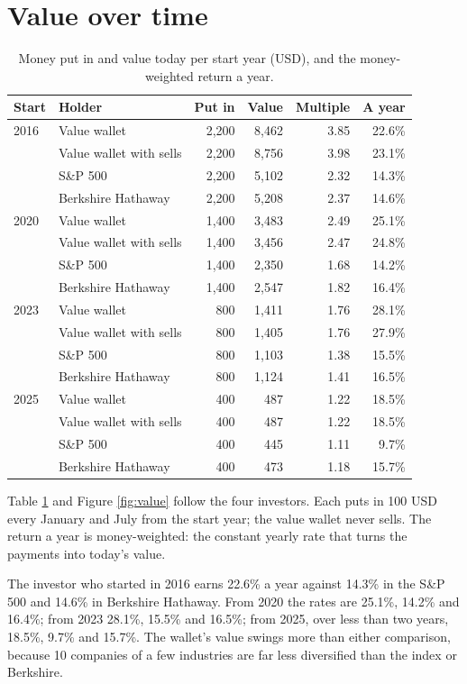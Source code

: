 \documentclass[11pt,a4paper]{article}
\begin{document}
\section{Value over time}
\begin{table}[H]
\centering
\small
\caption{Money put in and value today per start year (USD), and the money-weighted return a year.}\label{tab:value}
\begin{tabular}{l l r r r r}
\hline
Start & Holder & Put in & Value & Multiple & A year \\
\hline
2016 & Value wallet & 2,200 & 8,462 & 3.85 & 22.6\% \\
 & Value wallet with sells & 2,200 & 8,756 & 3.98 & 23.1\% \\
 & S\&P 500 & 2,200 & 5,102 & 2.32 & 14.3\% \\
 & Berkshire Hathaway & 2,200 & 5,208 & 2.37 & 14.6\% \\
\hline
2020 & Value wallet & 1,400 & 3,483 & 2.49 & 25.1\% \\
 & Value wallet with sells & 1,400 & 3,456 & 2.47 & 24.8\% \\
 & S\&P 500 & 1,400 & 2,350 & 1.68 & 14.2\% \\
 & Berkshire Hathaway & 1,400 & 2,547 & 1.82 & 16.4\% \\
\hline
2023 & Value wallet & 800 & 1,411 & 1.76 & 28.1\% \\
 & Value wallet with sells & 800 & 1,405 & 1.76 & 27.9\% \\
 & S\&P 500 & 800 & 1,103 & 1.38 & 15.5\% \\
 & Berkshire Hathaway & 800 & 1,124 & 1.41 & 16.5\% \\
\hline
2025 & Value wallet & 400 & 487 & 1.22 & 18.5\% \\
 & Value wallet with sells & 400 & 487 & 1.22 & 18.5\% \\
 & S\&P 500 & 400 & 445 & 1.11 & 9.7\% \\
 & Berkshire Hathaway & 400 & 473 & 1.18 & 15.7\% \\
\hline
\end{tabular}
\end{table}
Table \ref{tab:value} and Figure \ref{fig:value} follow the four investors. Each puts in 100 USD every January and July from the start year; the value wallet never sells. The return a year is money-weighted: the constant yearly rate that turns the payments into today's value.

The investor who started in 2016 earns 22.6\% a year against 14.3\% in the S\&P 500 and 14.6\% in Berkshire Hathaway. From 2020 the rates are 25.1\%, 14.2\% and 16.4\%; from 2023 28.1\%, 15.5\% and 16.5\%; from 2025, over less than two years, 18.5\%, 9.7\% and 15.7\%. The wallet's value swings more than either comparison, because 10 companies of a few industries are far less diversified than the index or Berkshire.
\end{document}

